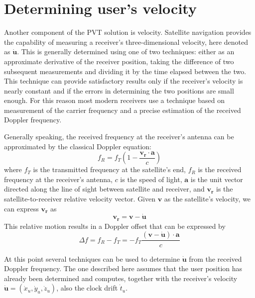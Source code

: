 \section{Determining user's velocity}
Another component of the PVT solution is velocity. Satellite navigation provides
the capability of measuring a receiver's three-dimensional velocity, here
denoted as $\bm{\dot u}$. This is generally determined using one of two
techniques: either as an approximate derivative of the receiver position, taking
the difference of two subsequent measurements and dividing it by the time
elapsed between the two. This technique can provide satisfactory results only if
the receiver's velocity is nearly constant and if the errors in determining the
two positions are small enough. For this reason most modern receivers use a
technique based on measurement of the carrier frequency and a precise estimation
of the received Doppler frequency.

\par

Generally speaking, the received frequency at the receiver's antenna can be
approximated by the classical Doppler equation:
\begin{equation} \label{eq:doppler}
  f_R = f_T \left(1-\frac{\bm{v_r} \cdot \bm{a}}{c}\right)
\end{equation}
where $f_T$ is the transmitted frequency at the satellite's end, $f_R$ is the
received frequency at the receiver's antenna, $c$ is the speed of light,
$\bm{a}$ is the unit vector directed along the line of sight between satellite
and receiver, and $\bm{v_r}$ is the satellite-to-receiver relative velocity
vector. Given $\bm{v}$ as the satellite's velocity, we can express $\bm{v_r}$ as
\begin{equation} \label{eq:user_velocity}
  \bm{v_r} = \bm{v} - \bm{\dot u}
\end{equation}
This relative motion results in a Doppler offset that can be expressed by
\begin{equation}
  \Delta f = f_R - f_T = -f_T \frac{(\bm{v} - \bm{\dot u}) \cdot \bm{a}}{c}
\end{equation}

At this point several techniques can be used to determine $\bm{\dot u}$ from the
received Doppler frequency. The one described here assumes that the user
position has already been determined and computes, together with the receiver's
velocity $\bm{\dot u} = (\dot x_u, \dot y_u, \dot z_u)$, also the clock drift
$\dot t_u$.

